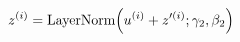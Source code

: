\documentclass[preview]{standalone}
\begin{document}
\begin{align*}
z^{(i)} = \text{LayerNorm}\Bigl(u^{(i)} + z'^{(i)}; \gamma_2, \beta_2\Bigr)
\end{align*}
\end{document}
